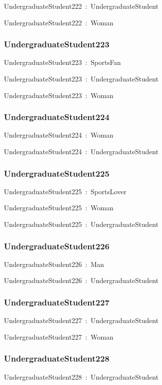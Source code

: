 \documentclass{article}
\begin{document}
UndergraduateStudent222~:~UndergraduateStudent

UndergraduateStudent222~:~Woman

\subsubsection*{UndergraduateStudent223}

UndergraduateStudent223~:~SportsFan

UndergraduateStudent223~:~UndergraduateStudent

UndergraduateStudent223~:~Woman

\subsubsection*{UndergraduateStudent224}

UndergraduateStudent224~:~Woman

UndergraduateStudent224~:~UndergraduateStudent

\subsubsection*{UndergraduateStudent225}

UndergraduateStudent225~:~SportsLover

UndergraduateStudent225~:~Woman

UndergraduateStudent225~:~UndergraduateStudent

\subsubsection*{UndergraduateStudent226}

UndergraduateStudent226~:~Man

UndergraduateStudent226~:~UndergraduateStudent

\subsubsection*{UndergraduateStudent227}

UndergraduateStudent227~:~UndergraduateStudent

UndergraduateStudent227~:~Woman

\subsubsection*{UndergraduateStudent228}

UndergraduateStudent228~:~UndergraduateStudent
\end{document}
